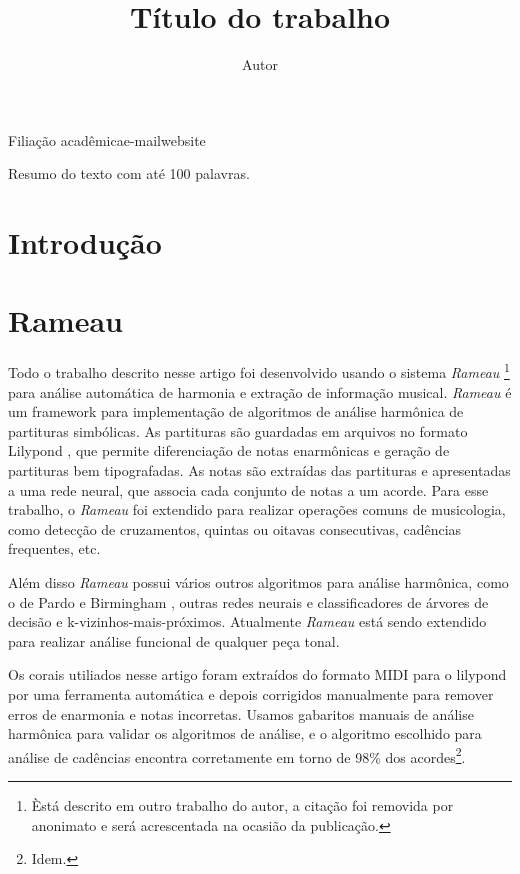 \documentclass{article}
\newcommand{\rameau}{\textit{Rameau}}
\begin{document}
\graphicspath{{figs/}}

\title{Título do trabalho}
\author{Autor}{Filiação acadêmica}{e-mail}{website}

\begin{sumario}
  Resumo do texto com até 100 palavras.  
\end{sumario}


\section{Introdução}
\label{sec:introducao}


\section{Rameau}
\label{sec:rameau}

Todo o trabalho descrito nesse artigo foi desenvolvido usando o
sistema \rameau{} \footnote{Èstá descrito em outro trabalho do autor,
  a citação foi removida por anonimato e será acrescentada na ocasião
  da publicação.} para análise automática de harmonia e extração de
informação musical. \rameau{} é um framework para implementação de
algoritmos de análise harmônica de partituras simbólicas. As
partituras são guardadas em arquivos no formato Lilypond
\cite{nienhuys.ea08:lilypond}, que permite diferenciação de notas
enarmônicas e geração de partituras bem tipografadas. As notas são
extraídas das partituras e apresentadas a uma rede neural, que associa
cada conjunto de notas a um acorde. Para esse trabalho, o \rameau{}
foi extendido para realizar operações comuns de musicologia, como
detecção de cruzamentos, quintas ou oitavas consecutivas, cadências
frequentes, etc.

Além disso \rameau{}  possui vários outros algoritmos para análise
harmônica, como o de Pardo e Birmingham \cite{pardo.ea00:automated},
outras redes neurais e classificadores de árvores de decisão e
k-vizinhos-mais-próximos. Atualmente \rameau{}  está sendo extendido para
realizar análise funcional de qualquer peça tonal.

Os corais utiliados nesse artigo foram extraídos do formato MIDI para
o lilypond por uma ferramenta automática e depois corrigidos
manualmente para remover erros de enarmonia e notas incorretas. Usamos
gabaritos manuais de análise harmônica para validar os algoritmos de
análise, e o algoritmo escolhido para análise de cadências encontra
corretamente em torno de 98\% dos acordes\footnote{Idem.}.
\end{document}
